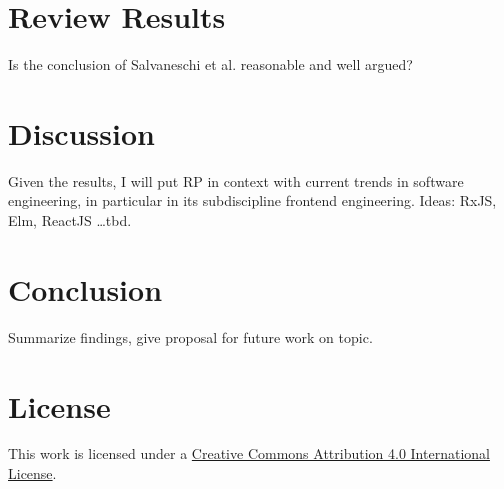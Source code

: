 \documentclass[12pt,a4paper]{article}
\begin{document}
\section{Review Results}
Is the conclusion of Salvaneschi et al. \cite{7827078} reasonable and well argued?



\section{Discussion}
Given the results, I will put RP in context with current trends in software engineering, in particular in its subdiscipline frontend engineering.
Ideas: RxJS, Elm, ReactJS \dots tbd.

\section{Conclusion}
Summarize findings, give proposal for future work on topic.




\section*{License}
\ccby\thinspace\thinspace This work is licensed under a \href{https://creativecommons.org/licenses/by/4.0/}{Creative Commons Attribution 4.0 International License}.
\end{document}
